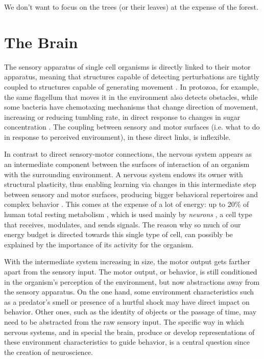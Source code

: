 \begin{savequote}
We don't want to focus on the trees (or their leaves) at the expense of the forest.
\end{savequote}

\chapter{The Brain}
\label{cap:thebrain}

The sensory apparatus of single cell organisms is directly linked to their motor apparatus, meaning that structures capable of detecting perturbations are tightly coupled to structures capable of generating movement \cite[p.~149]{maturana1987tree}. In protozoa, for example, the same flagellum that moves it in the environment also detects obstacles, while some bacteria have chemotaxing mechanisms that change direction of movement, increasing or reducing tumbling rate, in direct response to changes in sugar concentration \cite[p.~147-149]{maturana1987tree}. The coupling between sensory and motor surfaces (i.e. what to do in response to perceived environment), in these direct links, is inflexible.

In contrast to direct sensory-motor connections, the nervous system appears as an intermediate component between the surfaces of interaction of an organism with the surrounding environment. A nervous system endows its owner with structural plasticity, thus enabling learning via changes in this intermediate step between sensory and motor surfaces, producing bigger behavioral repertoires and complex behavior \cite[p.~175]{maturana1987tree}. This comes at the expense of a lot of energy: up to 20\% of human total resting metabolism \cite{attwell2001energy}, which is used mainly by \textit{neurons} \cite{zhu2012quantitative}, a cell type that receives, modulates, and sends signals. The reason why so much of our energy budget is directed towards this single type of cell, can possibly be explained by the importance of its activity for the organism.

With the intermediate system increasing in size, the motor output gets farther apart from the sensory input. The motor output, or behavior, is still conditioned in the organism's perception of the environment, but now abstractions away from the sensory apparatus. On the one hand, some environment characteristics such as a predator's smell or presence of a hurtful shock may have direct impact on behavior. Other ones, such as the identity of objects or the passage of time, may need to be abstracted from the raw sensory input. The specific way in which nervous systems, and in special the brain, produce or develop representations of these environment characteristics to guide behavior, is a central question since the creation of neuroscience.

